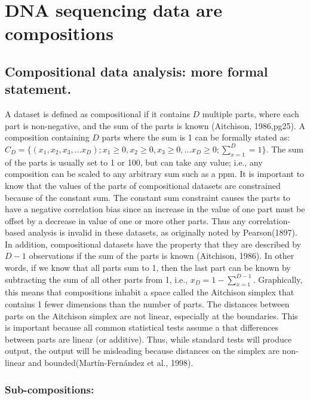 \documentclass[twocolumn]{article}
\begin{document}
\clearpage

\section{DNA sequencing data are
compositions}\label{dna-sequencing-data-are-compositions}

\subsection{Compositional data analysis: more formal
statement.}\label{compositional-data-analysis-more-formal-statement.}

A dataset is defined as compositional if it contains \(D\) multiple
parts, where each part is non-negative, and the sum of the parts is
known (Aitchison, 1986,pg25). A composition containing \(D\) parts where
the sum is 1 can be formally stated as:
\(C_D = \{(x_1,x_2,x_3, \ldots x_D); x_1\ge 0, x_2\ge 0, x_3 \ge 0, \ldots x_D \ge 0; \sum_{x=1}^{D} = 1\}\).
The sum of the parts is usually set to 1 or 100, but can take any value;
i.e., any composition can be scaled to any arbitrary sum such as a ppm.
It is important to know that the values of the parts of compositional
datasets are constrained because of the constant sum. The constant sum
constraint causes the parts to have a negative correlation bias since an
increase in the value of one part must be offset by a decrease in value
of one or more other parts. Thus any correlation-based analysis is
invalid in these datasets, as originally noted by Pearson(1897). In
addition, compositional datasets have the property that they are
described by \(D-1\) observations if the sum of the parts is known
(Aitchison, 1986). In other words, if we know that all parts sum to 1,
then the last part can be known by subtracting the sum of all other
parts from 1, i.e., \(x_D = 1-\sum_{x=1}^{D-1}\). Graphically, this
means that compositions inhabit a space called the Aitchison simplex
that contains 1 fewer dimensions than the number of parts. The distances
between parts on the Aitchison simplex are not linear, especially at the
boundaries. This is important because all common statistical tests
assume a that differences between parts are linear (or additive). Thus,
while standard tests will produce output, the output will be misleading
because distances on the simplex are non-linear and
bounded(Martín-Fernández et al., 1998).

\subsubsection{Sub-compositions:}
\end{document}
